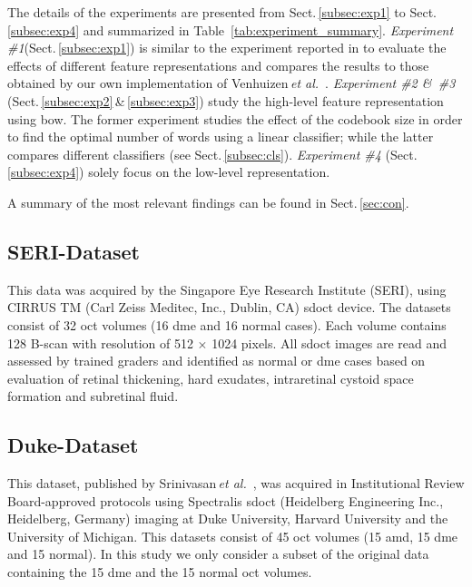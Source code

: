 The details of the experiments are presented from Sect.\,\ref{subsec:exp1} to Sect.\,\ref{subsec:exp4} and summarized in Table~\ref{tab:experiment_summary}.
\emph{Experiment \#1}(Sect.\,\ref{subsec:exp1}) is similar to the experiment reported in \cite{Lemaintre2015miccaiOCT} to evaluate the effects of different feature representations and compares the results to those obtained by our own implementation of Venhuizen\,\emph{et al.}~\cite{Venhuizen2015}.
\emph{Experiment \#2 \&\ \#3} (Sect.\,\ref{subsec:exp2}\,\&\,\ref{subsec:exp3}) study the high-level feature representation using \ac{bow}.
The former experiment studies the effect of the codebook size in order to find the optimal number of words using a linear classifier; while the latter compares different classifiers (see Sect.\,\ref{subsec:cls}).
\emph{Experiment \#4} (Sect.\,\ref{subsec:exp4}) solely focus on the low-level representation.

A summary of the most relevant findings can be found in Sect.\,\ref{sec:con}.





\subsection{SERI-Dataset}\label{sec:exp:dataset:seri}
This data was acquired by the Singapore Eye Research Institute (SERI), using CIRRUS TM (Carl Zeiss Meditec, Inc., Dublin, CA) \ac{sdoct} device. The datasets consist of 32 \ac{oct} volumes (16 \ac{dme} and 16 normal cases). Each volume contains 128 B-scan with resolution of 512 $\times$ 1024 pixels.
All \ac{sdoct} images are read and assessed by trained graders and identified as normal or \ac{dme} cases based on evaluation of retinal thickening, hard exudates, intraretinal cystoid space formation and subretinal fluid.

\subsection{Duke-Dataset} \label{sec:exp:dataset:duke}
This dataset, published by Srinivasan\,\emph{et al.}~\cite{Srinivasan2014}, was acquired in Institutional Review Board-approved protocols using Spectralis \ac{sdoct} (Heidelberg Engineering Inc., Heidelberg, Germany) imaging at Duke University, Harvard University and the University of Michigan.
This datasets consist of 45 \ac{oct} volumes (15 \ac{amd}, 15 \ac{dme} and 15 normal). In this study we only consider a subset of the original data containing the 15 \ac{dme} and the 15 normal \ac{oct} volumes.


